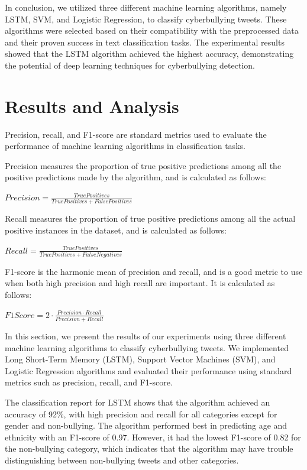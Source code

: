 \documentclass[conference]{IEEEtran}
\begin{document}
In conclusion, we utilized three different machine learning algorithms, namely LSTM, SVM, and Logistic Regression, to classify cyberbullying tweets. These algorithms were selected based on their compatibility with the preprocessed data and their proven success in text classification tasks. The experimental results showed that the LSTM algorithm achieved the highest accuracy, demonstrating the potential of deep learning techniques for cyberbullying detection.

\section{Results and Analysis}

Precision, recall, and F1-score are standard metrics used to evaluate the performance of machine learning algorithms in classification tasks.

Precision measures the proportion of true positive predictions among all the positive predictions made by the algorithm, and is calculated as follows:

$Precision = \frac{TruePositives}{TruePositives + FalsePositives}$

Recall measures the proportion of true positive predictions among all the actual positive instances in the dataset, and is calculated as follows:

$Recall = \frac{TruePositives}{TruePositives + FalseNegatives}$

F1-score is the harmonic mean of precision and recall, and is a good metric to use when both high precision and high recall are important. It is calculated as follows:

$F1Score = 2 \cdot \frac{Precision \cdot Recall}{Precision + Recall}$


In this section, we present the results of our experiments using three different machine learning algorithms to classify cyberbullying tweets. We implemented Long Short-Term Memory (LSTM), Support Vector Machines (SVM), and Logistic Regression algorithms and evaluated their performance using standard metrics such as precision, recall, and F1-score.

The classification report for LSTM shows that the algorithm achieved an accuracy of 92\%, with high precision and recall for all categories except for gender and non-bullying. The algorithm performed best in predicting age and ethnicity with an F1-score of 0.97. However, it had the lowest F1-score of 0.82 for the non-bullying category, which indicates that the algorithm may have trouble distinguishing between non-bullying tweets and other categories.
\end{document}
